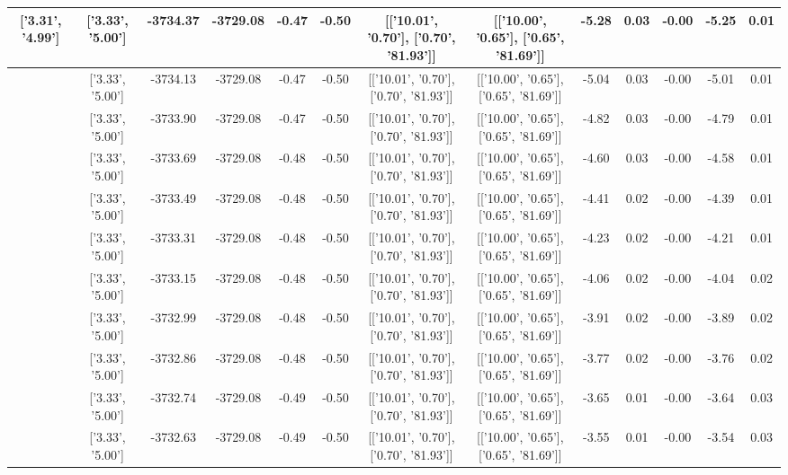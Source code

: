 \begin{table}[htbp]
\begin{adjustbox}{angle=90}
\begin{tabular}{|c|c|c|c|c|c|c|c|c|c|c|c|c|}
 ['3.31', '4.99'] & ['3.33', '5.00'] & -3734.37 & -3729.08 & -0.47 & -0.50 & [['10.01', '0.70'], ['0.70', '81.93']] & [['10.00', '0.65'], ['0.65', '81.69']] & -5.28 & 0.03 & -0.00 & -5.25 & 0.01\\ \hline
 ['3.31', '4.99'] & ['3.33', '5.00'] & -3734.13 & -3729.08 & -0.47 & -0.50 & [['10.01', '0.70'], ['0.70', '81.93']] & [['10.00', '0.65'], ['0.65', '81.69']] & -5.04 & 0.03 & -0.00 & -5.01 & 0.01\\ \hline
 ['3.31', '4.99'] & ['3.33', '5.00'] & -3733.90 & -3729.08 & -0.47 & -0.50 & [['10.01', '0.70'], ['0.70', '81.93']] & [['10.00', '0.65'], ['0.65', '81.69']] & -4.82 & 0.03 & -0.00 & -4.79 & 0.01\\ \hline
 ['3.31', '4.99'] & ['3.33', '5.00'] & -3733.69 & -3729.08 & -0.48 & -0.50 & [['10.01', '0.70'], ['0.70', '81.93']] & [['10.00', '0.65'], ['0.65', '81.69']] & -4.60 & 0.03 & -0.00 & -4.58 & 0.01\\ \hline
 ['3.32', '4.99'] & ['3.33', '5.00'] & -3733.49 & -3729.08 & -0.48 & -0.50 & [['10.01', '0.70'], ['0.70', '81.93']] & [['10.00', '0.65'], ['0.65', '81.69']] & -4.41 & 0.02 & -0.00 & -4.39 & 0.01\\ \hline
 ['3.32', '5.00'] & ['3.33', '5.00'] & -3733.31 & -3729.08 & -0.48 & -0.50 & [['10.01', '0.70'], ['0.70', '81.93']] & [['10.00', '0.65'], ['0.65', '81.69']] & -4.23 & 0.02 & -0.00 & -4.21 & 0.01\\ \hline
 ['3.32', '5.00'] & ['3.33', '5.00'] & -3733.15 & -3729.08 & -0.48 & -0.50 & [['10.01', '0.70'], ['0.70', '81.93']] & [['10.00', '0.65'], ['0.65', '81.69']] & -4.06 & 0.02 & -0.00 & -4.04 & 0.02\\ \hline
 ['3.32', '5.00'] & ['3.33', '5.00'] & -3732.99 & -3729.08 & -0.48 & -0.50 & [['10.01', '0.70'], ['0.70', '81.93']] & [['10.00', '0.65'], ['0.65', '81.69']] & -3.91 & 0.02 & -0.00 & -3.89 & 0.02\\ \hline
 ['3.32', '5.00'] & ['3.33', '5.00'] & -3732.86 & -3729.08 & -0.48 & -0.50 & [['10.01', '0.70'], ['0.70', '81.93']] & [['10.00', '0.65'], ['0.65', '81.69']] & -3.77 & 0.02 & -0.00 & -3.76 & 0.02\\ \hline
 ['3.32', '5.00'] & ['3.33', '5.00'] & -3732.74 & -3729.08 & -0.49 & -0.50 & [['10.01', '0.70'], ['0.70', '81.93']] & [['10.00', '0.65'], ['0.65', '81.69']] & -3.65 & 0.01 & -0.00 & -3.64 & 0.03\\ \hline
 ['3.32', '5.00'] & ['3.33', '5.00'] & -3732.63 & -3729.08 & -0.49 & -0.50 & [['10.01', '0.70'], ['0.70', '81.93']] & [['10.00', '0.65'], ['0.65', '81.69']] & -3.55 & 0.01 & -0.00 & -3.54 & 0.03\\ \hline

\end{tabular}
\end{adjustbox}
\end{table}

